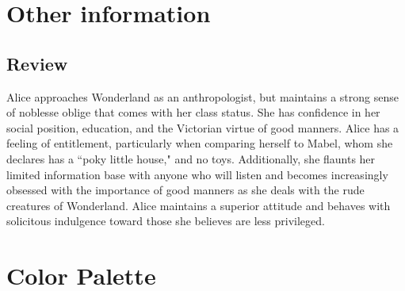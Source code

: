 \documentclass[letterpaper]{twentysecondcv} %
\begin{document}
\cvnewpage %

% 



\section{Other information}

\subsection{Review}

Alice approaches Wonderland as an anthropologist, but maintains a strong sense of noblesse oblige that comes with her class status. She has confidence in her social position, education, and the Victorian virtue of good manners. Alice has a feeling of entitlement, particularly when comparing herself to Mabel, whom she declares has a ``poky little house," and no toys. Additionally, she flaunts her limited information base with anyone who will listen and becomes increasingly obsessed with the importance of good manners as she deals with the rude creatures of Wonderland. Alice maintains a superior attitude and behaves with solicitous indulgence toward those she believes are less privileged.

\section{Color Palette}
\drawpalette

\end{document}
